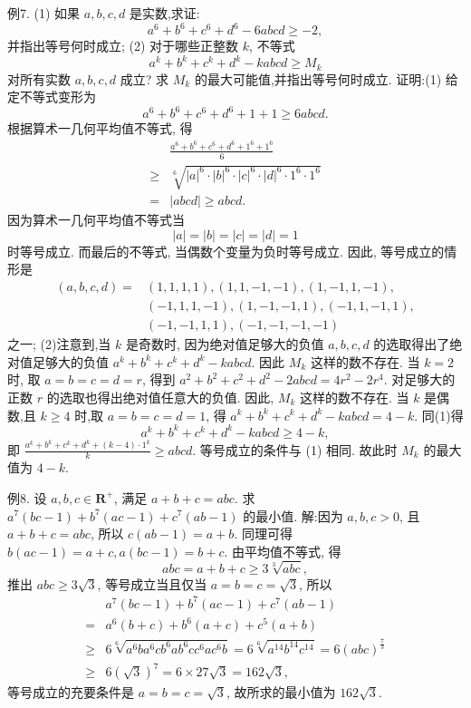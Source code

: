 例7. (1) 如果 $a, b, c, d$ 是实数,求证:
$$
a^6+b^6+c^6+d^6-6 a b c d \geqslant-2,
$$
并指出等号何时成立;
(2) 对于哪些正整数 $k$, 不等式
$$
a^k+b^k+c^k+d^k-k a b c d \geqslant M_k
$$
对所有实数 $a, b, c, d$ 成立? 求 $M_k$ 的最大可能值,并指出等号何时成立.
证明:(1) 给定不等式变形为
$$
a^6+b^6+c^6+d^6+1+1 \geqslant 6 a b c d .
$$
根据算术一几何平均值不等式, 得
$$
\begin{aligned}
& \frac{a^6+b^6+c^6+d^6+1^6+1^6}{6} \\
\geqslant & \sqrt[6]{|a|^6 \cdot|b|^6 \cdot|c|^6 \cdot|d|^6 \cdot 1^6 \cdot 1^6} \\
= & |a b c d| \geqslant a b c d .
\end{aligned}
$$
因为算术一几何平均值不等式当
$$
|a|=|b|=|c|=|d|=1
$$
时等号成立.
而最后的不等式, 当偶数个变量为负时等号成立.
因此, 等号成立的情形是
$$
\begin{aligned}
(a, b, c, d)= & (1,1,1,1),(1,1,-1,-1),(1,-1,1,-1), \\
& (-1,1,1,-1),(1,-1,-1,1),(-1,1,-1,1), \\
& (-1,-1,1,1),(-1,-1,-1,-1)
\end{aligned}
$$
之一;
(2)注意到,当 $k$ 是奇数时, 因为绝对值足够大的负值 $a, b, c, d$ 的选取得出了绝对值足够大的负值 $a^k+b^k+c^k+d^k-k a b c d$. 因此 $M_k$ 这样的数不存在.
当 $k=2$ 时, 取 $a=b=c=d=r$, 得到 $a^2+b^2+c^2+d^2-2 a b c d= 4 r^2-2 r^4$.
对足够大的正数 $r$ 的选取也得出绝对值任意大的负值.
因此, $M_k$ 这样的数不存在.
当 $k$ 是偶数,且 $k \geqslant 4$ 时,取 $a=b=c=d=1$, 得 $a^k+b^k+c^k+d^k- k a b c d=4-k$.
同(1)得
$$
a^k+b^k+c^k+d^k-k a b c d \geqslant 4-k,
$$
即 $\frac{a^k+b^k+c^k+d^k+(k-4) \cdot 1^k}{k} \geqslant a b c d$.
等号成立的条件与 (1) 相同.
故此时 $M_k$ 的最大值为 $4-k$.



例8. 设 $a, b, c \in \mathbf{R}^{+}$, 满足 $a+b+c=a b c$. 求 $a^7(b c-1)+ b^7(a c-1)+c^7(a b-1)$ 的最小值.
解:因为 $a, b, c>0$, 且 $a+b+c=a b c$, 所以 $c(a b-1)=a+b$.
同理可得 $b(a c-1)=a+c, a(b c-1)=b+c$.
由平均值不等式, 得
$$
a b c=a+b+c \geqslant 3 \sqrt[3]{a b c},
$$
推出 $a b c \geqslant 3 \sqrt{3}$, 等号成立当且仅当 $a=b=c=\sqrt{3}$, 所以
$$
\begin{aligned}
& a^7(b c-1)+b^7(a c-1)+c^7(a b-1) \\
= & a^6(b+c)+b^6(a+c)+c^5(a+b) \\
\geqslant & 6 \sqrt[6]{a^6 b a^6 c b^6 a b^6 c c^6 a c^6 b}=6 \sqrt[6]{a^{14} b^{14} c^{14}}=6(a b c)^{\frac{7}{3}} \\
\geqslant & 6(\sqrt{3})^7=6 \times 27 \sqrt{3}=162 \sqrt{3},
\end{aligned}
$$
等号成立的充要条件是 $a=b=c=\sqrt{3}$, 故所求的最小值为 $162 \sqrt{3}$.



